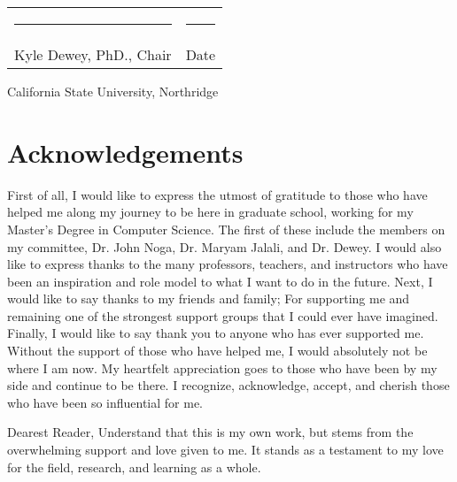 \documentclass[12pt]{report} %
\begin{document}
        \begin{center}
            \begin{tabular}{p{3in} p{1in}}
                \rule{3in}{0.4pt} & \rule{1in}{0.4pt}\\
                Kyle Dewey, PhD., Chair & Date \\
            \end{tabular}
        \end{center}

        \vspace{\fill}

        \begin{center}
            California State University, Northridge
        \end{center}

    \newpage

    \chapter*{\normalfont Acknowledgements}\label{chapter:Acknowledgements}
        \begin{center}
            First of all, I would like to express the utmost of gratitude to those who have helped me along my journey to be here in graduate school, working for my Master's Degree in Computer Science.
            The first of these include the members on my committee, Dr. John Noga, Dr. Maryam Jalali, and Dr. Dewey.
            I would also like to express thanks to the many professors, teachers, and instructors who have been an inspiration and role model to what I want to do in the future.
            Next, I would like to say thanks to my friends and family; For supporting me and remaining one of the strongest support groups that I could ever have imagined.
            Finally, I would like to say thank you to anyone who has ever supported me.
            Without the support of those who have helped me, I would absolutely not be where I am now.
            My heartfelt appreciation goes to those who have been by my side and continue to be there.
            I recognize, acknowledge, accept, and cherish those who have been so influential for me.

            Dearest Reader,
            Understand that this is my own work, but stems from the overwhelming support and love given to me.
            It stands as a testament to my love for the field, research, and learning as a whole.
        \end{center}
    
\end{document}
